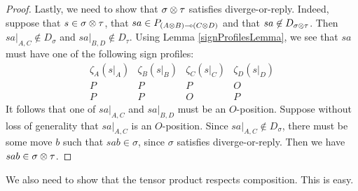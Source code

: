 \documentclass{entcs} \usepackage{prentcsmacro}
\newcommand{\0}{{\mathtt{0}}}
\begin{document}
\begin{proof}
    Lastly, we need to show that $\sigma\otimes\tau$ satisfies diverge-or-reply.  Indeed, suppose that $s\in\sigma\otimes\tau$, that $sa\in P_{(A\otimes B)\multimap (C\otimes D)}$ and that $sa\not\in D_{\sigma\otimes\tau}$.  Then $sa\vert_{A,C}\not\in D_\sigma$ and $sa\vert_{B,D}\not\in D_\tau$.  Using Lemma \ref{signProfilesLemma}, we see that $sa$ must have one of the following sign profiles:
    \[
      \begin{array}{cccc}
        \zeta_A(s\vert_A) & \zeta_B(s\vert_B) & \zeta_C(s\vert_C) & \zeta_D(s\vert_D) \\
        \hline
        P & P & P & O \\
        P & P & O & P
      \end{array}
      \]
    It follows that one of $sa\vert_{A,C}$ and $sa\vert_{B,D}$ must be an $O$-position.  Suppose without loss of generality that $sa\vert_{A,C}$ is an $O$-position.  Since $sa\vert_{A,C}\not\in D_\sigma$, there must be some move $b$ such that $sab\in\sigma$, since $\sigma$ satisfies diverge-or-reply.  Then we have $sab\in\sigma\otimes\tau$.
  \end{proof}

We also need to show that the tensor product respects composition.  This is easy.
\end{document}
